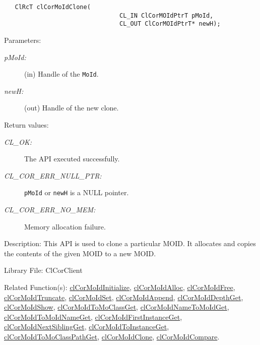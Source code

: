 \begin{flushleft}
\begin{Desc}
\footnotesize\begin{verbatim}   ClRcT clCorMoIdClone(
                         		CL_IN ClCorMOIdPtrT pMoId,
                         		CL_OUT ClCorMOIdPtrT* newH);
\end{verbatim}
\normalsize
\end{Desc}
\begin{Desc}
\item[Parameters:]
\begin{description}
\item[{\em p\-MoId:}](in) Handle of the {\tt{MoId}}. 
\item[{\em new\-H:}](out) Handle of the new clone.\end{description}
\end{Desc}
\begin{Desc}
\item[Return values:]
\begin{description}
\item[{\em CL\_\-OK:}]The API executed successfully. 
\item[{\em CL\_\-COR\_\-ERR\_\-NULL\_\-PTR:}] {\tt{pMoId}} or {\tt{newH}} is a NULL pointer.
\item[{\em CL\_\-COR\_\-ERR\_\-NO\_\-MEM:}]Memory allocation failure.\end{description}
\end{Desc}
\begin{Desc}
\item[Description:]This API is used to clone a particular MOID. It allocates and copies the contents of the given MOID
to a new MOID.\end{Desc}
\begin{Desc}
\item[Library File:]Cl\-Cor\-Client\end{Desc}
\begin{Desc}
\item[Related Function(s):]\hyperlink{pagecor100}{cl\-Cor\-MoId\-Initialize}, \hyperlink{pagecor113}{cl\-Cor\-MoId\-Alloc}, 
\hyperlink{pagecor114}{cl\-Cor\-MoId\-Free},
\hyperlink{pagecor115}{cl\-Cor\-MoId\-Truncate}, 
\hyperlink{pagecor116}{cl\-Cor\-MoId\-Set}, 
\hyperlink{pagecor117}{cl\-Cor\-MoId\-Append}, 
\hyperlink{pagecor118}{cl\-Cor\-MoId\-Depth\-Get}, 
\hyperlink{pagecor119}{cl\-Cor\-MoId\-Show}, 
\hyperlink{pagecor120}{cl\-Cor\-MoId\-To\-Mo\-Class\-Get}, 
\hyperlink{pagecor121}{cl\-Cor\-MoId\-Name\-To\-MoId\-Get}, 
\hyperlink{pagecor122}{cl\-Cor\-MoId\-To\-MoId\-Name\-Get}, 
\hyperlink{pagecor123}{cl\-Cor\-MoId\-First\-Instance\-Get},
\hyperlink{pagecor124}{cl\-Cor\-MoId\-Next\-Sibling\-Get}, 
\hyperlink{pagecor125}{cl\-Cor\-MoId\-To\-Instance\-Get}, 
\hyperlink{pagecor126}{cl\-Cor\-MoId\-To\-Mo\-Class\-Path\-Get}, 
\hyperlink{pagecor127}{cl\-Cor\-MoId\-Clone}, 
\hyperlink{pagecor128}{cl\-Cor\-MoId\-Compare}. \end{Desc}
\newpage




\end{flushleft}
